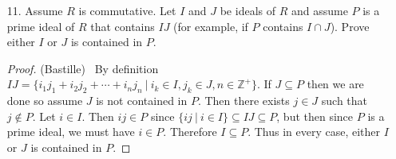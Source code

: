 \documentclass[10pt]{article}
\newcommand{\Z}{\mathbb{Z}}
\begin{document}
\begin{itemize}
\item[11.] Assume $R$ is commutative. Let $I$ and $J$ be ideals of $R$ and assume $P$ is a prime ideal of $R$ that contains $IJ$ (for example, if $P$ contains $I \cap J$). Prove either $I$ or $J$ is contained in $P$. 
\begin{proof} (Bastille) \ By definition $IJ=\{i_1j_1+i_2j_2+\cdots + i_nj_n \ | \ i_k \in I, j_k \in J, n \in \Z^{+} \}$. If $J \subseteq P$ then we are done so assume $J$ is not contained in $P$. Then there exists $j \in J$ such that $j \notin P$. Let $i \in I$. Then $ij \in P$ since $\{ij \ | \ i \in I \} \subseteq IJ \subseteq P$, but then since $P$ is a prime ideal, we must have $i \in P$. Therefore $I \subseteq P$. Thus in every case, either $I$ or $J$ is contained in $P$. 
\end{proof}


\end{itemize}
\end{document}
